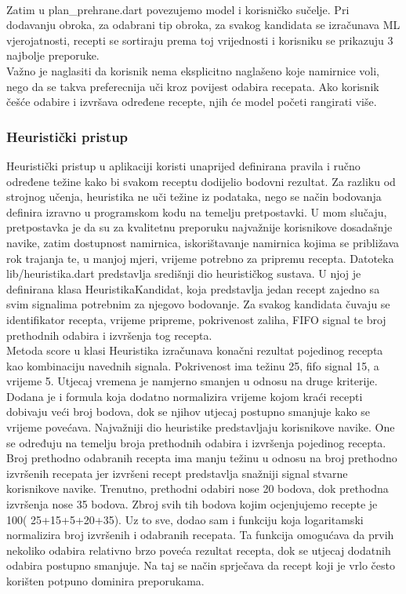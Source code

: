 \documentclass[diplomskirad]{fer}
\begin{document}
\\
Zatim u plan\_prehrane.dart povezujemo model i korisničko sučelje. Pri dodavanju obroka, za odabrani tip obroka, za svakog kandidata se izračunava ML vjerojatnosti, recepti se sortiraju prema toj vrijednosti i korisniku se prikazuju 3 najbolje preporuke. 
\\
Važno je naglasiti da korisnik nema eksplicitno naglašeno koje namirnice voli, nego da se takva preferecnija uči kroz povijest odabira recepata. Ako korisnik češće odabire i izvršava određene recepte, njih će model početi rangirati više.

\subsubsection{Heuristički pristup}
Heuristički pristup u aplikaciji koristi unaprijed definirana pravila i ručno određene težine kako bi svakom receptu dodijelio bodovni rezultat. Za razliku od strojnog učenja, heuristika ne uči težine iz podataka, nego se način bodovanja definira izravno u programskom kodu na temelju pretpostavki. U mom slučaju, pretpostavka je da su za kvalitetnu preporuku najvažnije korisnikove dosadašnje navike, zatim dostupnost namirnica, iskorištavanje namirnica kojima se približava rok trajanja te, u manjoj mjeri, vrijeme potrebno za pripremu recepta. Datoteka lib/heuristika.dart predstavlja središnji dio heurističkog sustava. U njoj je definirana klasa HeuristikaKandidat, koja predstavlja jedan recept zajedno sa svim signalima potrebnim za njegovo bodovanje. Za svakog kandidata čuvaju se identifikator recepta, vrijeme pripreme, pokrivenost zaliha, FIFO signal te broj prethodnih odabira i izvršenja tog recepta. 
\\
Metoda score u klasi Heuristika izračunava konačni rezultat pojedinog recepta kao kombinaciju navednih signala. Pokrivenost ima težinu 25, fifo signal 15, a vrijeme 5. Utjecaj vremena je namjerno smanjen u odnosu na druge kriterije. Dodana je i formula koja dodatno normalizira vrijeme kojom kraći recepti dobivaju veći broj bodova, dok se njihov utjecaj postupno smanjuje kako se vrijeme povećava. Najvažniji dio heuristike predstavljaju korisnikove navike. One se određuju na temelju broja prethodnih odabira i izvršenja pojedinog recepta. Broj prethodno odabranih recepta ima manju težinu u odnosu na broj prethodno izvršenih recepata jer izvršeni recept predstavlja snažniji signal stvarne korisnikove navike. Trenutno, prethodni odabiri nose 20 bodova, dok prethodna izvršenja nose 35 bodova. Zbroj svih tih bodova kojim ocjenjujemo recepte je 100( 25+15+5+20+35). Uz to sve, dodao sam i funkciju koja logaritamski normalizira broj izvršenih i odabranih recepata. Ta funkcija omogućava da prvih nekoliko odabira relativno brzo poveća rezultat recepta, dok se utjecaj dodatnih odabira postupno smanjuje. Na taj se način sprječava da recept koji je vrlo često korišten potpuno dominira preporukama.
\end{document}
